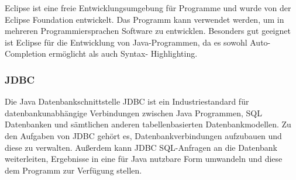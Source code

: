 Eclipse ist eine freie Entwicklungsumgebung für Programme und wurde von der Eclipse Foundation entwickelt. Das Programm kann verwendet werden, um in mehreren Programmiersprachen Software zu entwicklen. Besonders gut geeignet ist Eclipse für die Entwicklung von Java-Programmen, da es sowohl Auto-Completion ermöglicht als auch Syntax- Highlighting.

	   \subsubsection{JDBC}

Die Java Datenbankschnittstelle JDBC ist ein Industriestandard für datenbankunabhängige Verbindungen zwischen Java Programmen, SQL Datenbanken und sämtlichen anderen tabellenbasierten Datenbankmodellen. Zu den Aufgaben von JDBC gehört es, Datenbankverbindungen aufzubauen und diese zu verwalten. Außerdem kann JDBC  SQL-Anfragen an die Datenbank weiterleiten, Ergebnisse in eine für Java nutzbare Form umwandeln und diese dem Programm zur Verfügung stellen.
    
